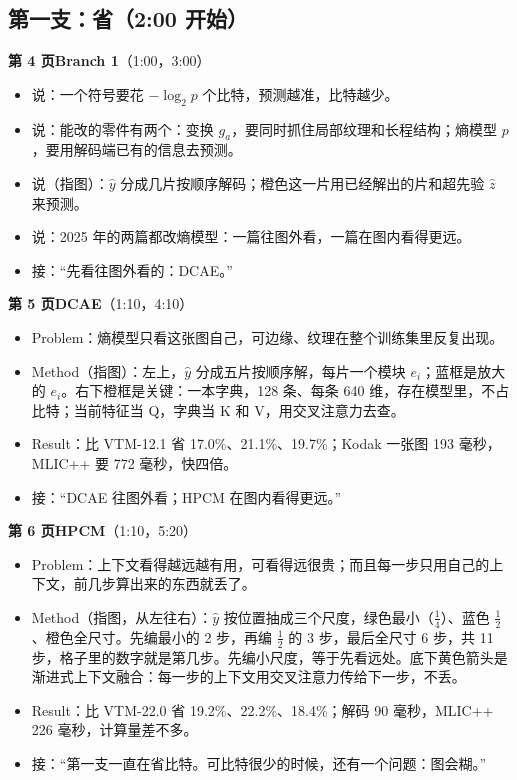 \subsection*{\textcolor{sig}{第一支：省}（2:00 开始）}

\textbf{第 4 页\quad Branch 1}（1:00，3:00）
\begin{itemize}
  \item 说：一个符号要花 $-\log_2 p$ 个比特，预测越准，比特越少。
  \item 说：能改的零件有两个：变换 $g_a$，要同时抓住局部纹理和长程结构；熵模型 $p$，要用解码端已有的信息去预测。
  \item 说（指图）：$\hat y$ 分成几片按顺序解码；橙色这一片用已经解出的片和超先验 $\hat z$ 来预测。
  \item 说：2025 年的两篇都改熵模型：一篇往图外看，一篇在图内看得更远。
  \item 接：“先看往图外看的：DCAE。”
\end{itemize}

\textbf{第 5 页\quad DCAE}（1:10，4:10）
\begin{itemize}
  \item Problem：熵模型只看这张图自己，可边缘、纹理在整个训练集里反复出现。
  \item Method（指图）：左上，$\hat y$ 分成五片按顺序解，每片一个模块 $e_i$；蓝框是放大的 $e_i$。右下橙框是关键：一本字典，128 条、每条 640 维，存在模型里，不占比特；当前特征当 Q，字典当 K 和 V，用交叉注意力去查。
  \item Result：比 VTM-12.1 省 17.0\%、21.1\%、19.7\%；Kodak 一张图 193 毫秒，MLIC++ 要 772 毫秒，快四倍。
  \item 接：“DCAE 往图外看；HPCM 在图内看得更远。”
\end{itemize}

\textbf{第 6 页\quad HPCM}（1:10，5:20）
\begin{itemize}
  \item Problem：上下文看得越远越有用，可看得远很贵；而且每一步只用自己的上下文，前几步算出来的东西就丢了。
  \item Method（指图，从左往右）：$\hat y$ 按位置抽成三个尺度，绿色最小（$\frac14$）、蓝色 $\frac12$、橙色全尺寸。先编最小的 2 步，再编 $\frac12$ 的 3 步，最后全尺寸 6 步，共 11 步，格子里的数字就是第几步。先编小尺度，等于先看远处。底下黄色箭头是渐进式上下文融合：每一步的上下文用交叉注意力传给下一步，不丢。
  \item Result：比 VTM-22.0 省 19.2\%、22.2\%、18.4\%；解码 90 毫秒，MLIC++ 226 毫秒，计算量差不多。
  \item 接：“第一支一直在省比特。可比特很少的时候，还有一个问题：图会糊。”
\end{itemize}


